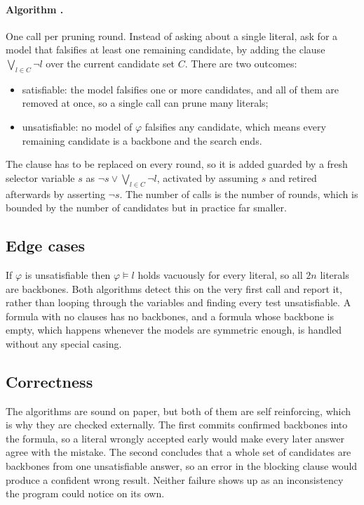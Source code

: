 \documentclass[11pt,a4paper]{article}
\begin{document}
\paragraph{Algorithm .}
One call per pruning round. Instead of asking about a single literal, ask for
a model that falsifies at least one remaining candidate, by adding the clause
$\bigvee_{l \in C} \neg l$ over the current candidate set $C$. There are two
outcomes:
\begin{itemize}
  \item satisfiable: the model falsifies one or more candidates, and all of
  them are removed at once, so a single call can prune many literals;
  \item unsatisfiable: no model of $\varphi$ falsifies any candidate, which
  means every remaining candidate is a backbone and the search ends.
\end{itemize}
The clause has to be replaced on every round, so it is added guarded by a
fresh selector variable $s$ as $\neg s \vee \bigvee_{l \in C} \neg l$,
activated by assuming $s$ and retired afterwards by asserting $\neg s$. The
number of calls is the number of rounds, which is bounded by the number of
candidates but in practice far smaller.

\subsection*{Edge cases}

If $\varphi$ is unsatisfiable then $\varphi \models l$ holds vacuously for
every literal, so all $2n$ literals are backbones. Both algorithms detect this
on the very first call and report it, rather than looping through the
variables and finding every test unsatisfiable. A formula with no clauses has
no backbones, and a formula whose backbone is empty, which happens whenever
the models are symmetric enough, is handled without any special casing.

\subsection*{Correctness}
\label{sec:correctness}

The algorithms are sound on paper, but both of them are self reinforcing,
which is why they are checked externally. The first commits confirmed
backbones into the formula, so a literal wrongly accepted early would make
every later answer agree with the mistake. The second concludes that a whole
set of candidates are backbones from one unsatisfiable answer, so an error in
the blocking clause would produce a confident wrong result. Neither failure
shows up as an inconsistency the program could notice on its own.
\end{document}

